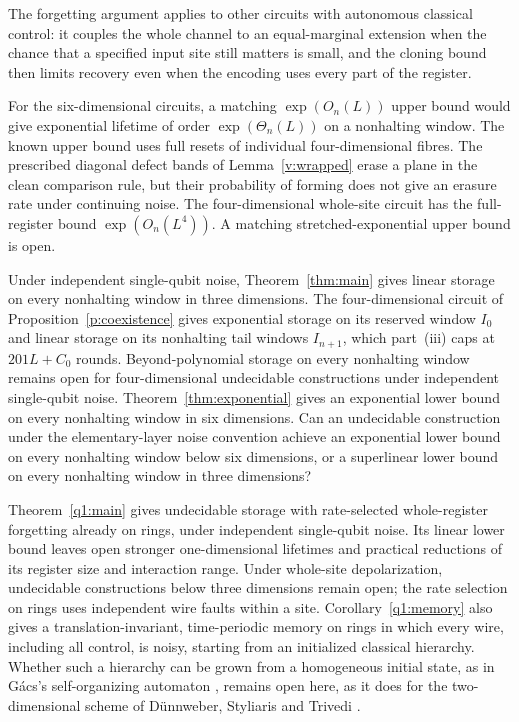 The forgetting argument applies to other circuits with autonomous classical control: it couples the whole channel to an equal-marginal extension when the chance that a specified input site still matters is small, and the cloning bound then limits recovery even when the encoding uses every part of the register.

For the six-dimensional circuits, a matching \(\exp(O_n(L))\) upper bound would give exponential lifetime of order \(\exp(\Theta_n(L))\) on a nonhalting window. The known upper bound uses full resets of individual four-dimensional fibres. The prescribed diagonal defect bands of Lemma~\ref{v:wrapped} erase a plane in the clean comparison rule, but their probability of forming does not give an erasure rate under continuing noise. The four-dimensional whole-site circuit has the full-register bound \(\exp(O_n(L^4))\). A matching stretched-exponential upper bound is open.

Under independent single-qubit noise, Theorem~\ref{thm:main} gives linear
storage on every nonhalting window in three dimensions. The
four-dimensional circuit of Proposition~\ref{p:coexistence} gives
exponential storage on its reserved window \(I_0\) and linear storage
on its nonhalting tail windows \(I_{n+1}\), which part~(iii) caps at
\(201L+C_0\) rounds. Beyond-polynomial storage on every nonhalting
window remains open for four-dimensional undecidable constructions
under independent single-qubit noise. Theorem~\ref{thm:exponential}
gives an exponential lower bound on every nonhalting window in six
dimensions. Can an undecidable construction under the elementary-layer
noise convention achieve an exponential lower bound on every nonhalting
window below six dimensions, or a superlinear lower bound on every
nonhalting window in three dimensions?

Theorem~\ref{q1:main} gives undecidable storage with rate-selected whole-register forgetting already on rings, under independent single-qubit noise. Its linear lower bound leaves open stronger one-dimensional lifetimes and practical reductions of its register size and interaction range. Under whole-site depolarization, undecidable constructions below three dimensions remain open; the rate selection on rings uses independent wire faults within a site. Corollary~\ref{q1:memory} also gives a translation-invariant, time-periodic memory on rings in which every wire, including all control, is noisy, starting from an initialized classical hierarchy. Whether such a hierarchy can be grown from a homogeneous initial state, as in G\'acs's self-organizing automaton \cite{Gacs2001}, remains open here, as it does for the two-dimensional scheme of D\"unnweber, Styliaris and Trivedi \cite{DST2026}.

